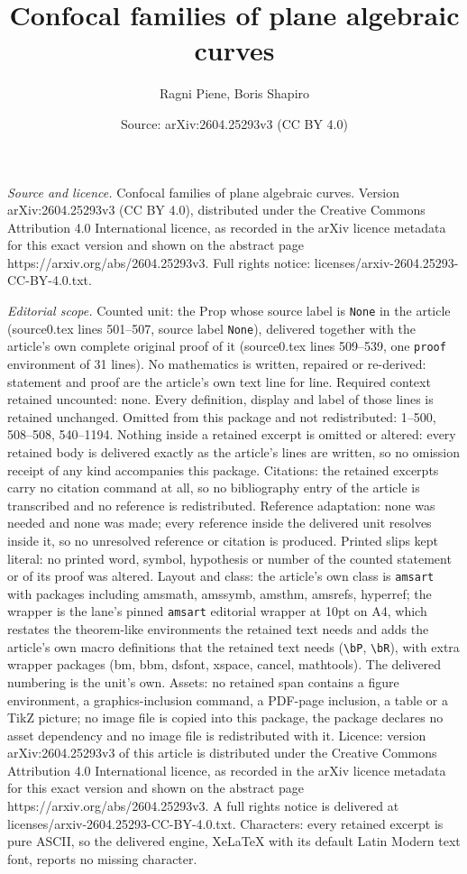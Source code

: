 \documentclass[10pt,a4paper]{amsart}
\title[Confocal families of plane algebraic curves]{Confocal families of plane algebraic curves}
\author{Ragni Piene, Boris Shapiro}
\date{Source: arXiv:2604.25293v3 (CC BY 4.0)}
\begin{document}
\maketitle

\noindent\emph{Source and licence.} Confocal families of plane algebraic curves. Version arXiv:2604.25293v3 (CC BY 4.0), distributed under the Creative Commons Attribution 4.0 International licence, as recorded in the arXiv licence metadata for this exact version and shown on the abstract page https://arxiv.org/abs/2604.25293v3. Full rights notice: licenses/arxiv-2604.25293-CC-BY-4.0.txt.\par\smallskip

\noindent\textit{Editorial scope.} Counted unit: the Prop whose source label is \texttt{None} in the article (source0.tex lines 501--507, source label \texttt{None}), delivered together with the article's own complete original proof of it (source0.tex lines 509--539, one \texttt{proof} environment of 31 lines). No mathematics is written, repaired or re-derived: statement and proof are the article's own text line for line. Required context retained uncounted: none. Every definition, display and label of those lines is retained unchanged. Omitted from this package and not redistributed: 1--500, 508--508, 540--1194. Nothing inside a retained excerpt is omitted or altered: every retained body is delivered exactly as the article's lines are written, so no omission receipt of any kind accompanies this package. Citations: the retained excerpts carry no citation command at all, so no bibliography entry of the article is transcribed and no reference is redistributed. Reference adaptation: none was needed and none was made; every reference inside the delivered unit resolves inside it, so no unresolved reference or citation is produced. Printed slips kept literal: no printed word, symbol, hypothesis or number of the counted statement or of its proof was altered. Layout and class: the article's own class is \texttt{amsart} with packages including amsmath, amssymb, amsthm, amsrefs, hyperref; the wrapper is the lane's pinned \texttt{amsart} editorial wrapper at 10pt on A4, which restates the theorem-like environments the retained text needs and adds the article's own macro definitions that the retained text needs (\texttt{\textbackslash bP}, \texttt{\textbackslash bR}), with extra wrapper packages (bm, bbm, dsfont, xspace, cancel, mathtools). The delivered numbering is the unit's own. Assets: no retained span contains a figure environment, a graphics-inclusion command, a PDF-page inclusion, a table or a TikZ picture; no image file is copied into this package, the package declares no asset dependency and no image file is redistributed with it. Licence: version arXiv:2604.25293v3 of this article is distributed under the Creative Commons Attribution 4.0 International licence, as recorded in the arXiv licence metadata for this exact version and shown on the abstract page https://arxiv.org/abs/2604.25293v3. A full rights notice is delivered at licenses/arxiv-2604.25293-CC-BY-4.0.txt. Characters: every retained excerpt is pure ASCII, so the delivered engine, XeLaTeX with its default Latin Modern text font, reports no missing character.
\end{document}
